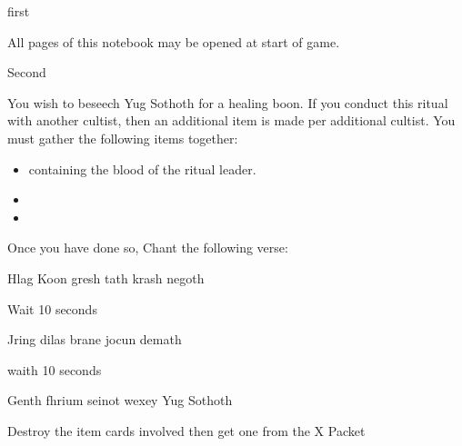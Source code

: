 \documentclass[greennotebook]{guildcamp4} %
\begin{document}
	
	\startnotebook{\nRasputinYog{}}
	
	\begin{page}{first}
		
		All pages of this notebook may be opened at start of game.
		
	\end{page}
	
	\begin{page}{Second}
		
		You wish to beseech Yug Sothoth for a healing boon. If you conduct this ritual with another cultist, then an additional item is made per additional cultist. You must gather the following items together: 
		
		\begin{itemize}
			\item \iTestTube{} containing the blood of the ritual leader.
			\item \iSieve{}
			\item \iCauldron{}
		\end{itemize}
		
		Once you have done so, Chant the following verse:
		
		Hlag Koon gresh tath krash negoth
		
		Wait 10 seconds
		
		Jring dilas brane jocun demath
		
		waith 10 seconds
		
		Genth fhrium seinot wexey Yug Sothoth
		
		Destroy the item cards involved then get one \iHealthPotion{} from the X Packet 
		
	\end{page}
	
\end{document}
